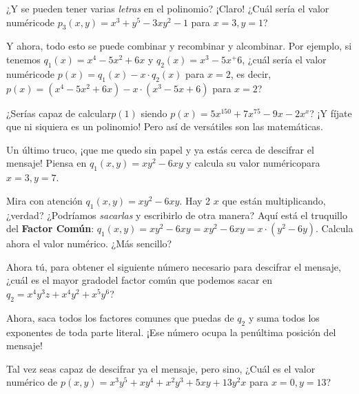 \documentclass{article}
\begin{document}
¿Y se pueden tener varias \textit{letras} en el polinomio? ¡Claro! ¿Cuál sería el valor numérico\footnotemark[1] de $p_3(x,y) = x^3+y^5-3xy^2-1$ para $x=3,y=1$?




Y ahora,  todo esto se puede combinar y recombinar y alcombinar.
%
Por ejemplo, si tenemos $q_1(x) = x^4-5x^2+6x$ y $q_2(x) = x^3-5x^+6$, ¿cuál sería el valor numérico\footnotemark[1] de $p(x) = q_1(x) - x\cdot q_2(x)$ para $x=2$, es decir, $p(x) = (x^4-5x^2+6x) - x\cdot (x^3-5x+6)$ para $x=2$?



\quad

¿Serías capaz de calcular\footnotemark[1] $p(1)$ siendo $p(x) = 5 x^{150} + 7x^{75} - 9x-2x^{x}$? ¡Y fíjate que ni siquiera es un polinomio! Pero así de versátiles son las matemáticas.



Un último truco, ¡que me quedo sin papel y ya estás cerca de descifrar el mensaje!
%
Piensa en $q_1(x,y) = xy^2-6xy$ y calcula su valor numérico\footnotemark[1] para $x=3,y=7$.



Mira con atención $q_1(x,y) = xy^2-6xy$. Hay 2 $x$ que están multiplicando, ¿verdad? ¿Podríamos \textit{sacarlas} y escribirlo de otra manera?
%
Aquí está el truquillo del \textbf{Factor Común}:
%
$q_1(x,y) = xy^2-6xy = xy^2-6xy = x\cdot (y^2-6y)$. 
%
Calcula ahora el valor numérico.
%
¿Más sencillo?

Ahora tú, para obtener el siguiente número necesario para descifrar el mensaje, ¿cuál es el mayor grado\footnotemark[1] del factor común que podemos sacar en
$q_2 = x^4y^3z + x^4y^2 + x^5y^6$?



Ahora, saca todos los factores comunes que puedas de $q_2$
y suma todos los exponentes de toda parte literal. ¡Ese número ocupa la penúltima posición del mensaje!


Tal vez seas capaz de descifrar ya el mensaje, pero sino, ¿Cuál es el valor numérico \footnotemark[1] de $p(x,y) = x^3y^5 + xy^4+x^2y^3+5xy+13y^2x$ para $x=0,y=13$?


\end{document}
